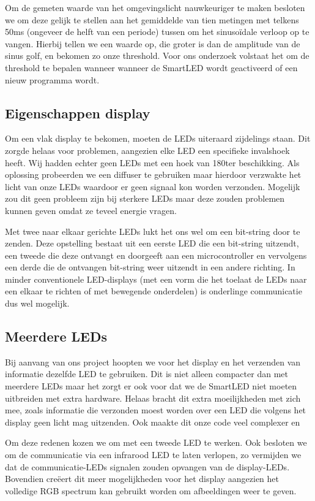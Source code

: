 \documentclass{article}
\begin{document}
Om de gemeten waarde van het omgevingslicht nauwkeuriger te maken besloten we om deze gelijk te stellen aan het gemiddelde van tien metingen met telkens 50ms (ongeveer de helft van een periode) tussen om het sinusoïdale verloop op te vangen. Hierbij tellen we een waarde op, die groter is dan de amplitude van de sinus golf, en bekomen zo onze threshold. 
Voor ons onderzoek volstaat het om de threshold te bepalen wanneer wanneer de SmartLED wordt geactiveerd of een nieuw programma wordt.

\subsection{Eigenschappen display}

Om een vlak display te bekomen, moeten de LEDs uiteraard zijdelings staan. Dit zorgde helaas voor problemen, aangezien elke LED een specifieke invalshoek heeft. Wij hadden echter geen LEDs met een hoek van 180\degree ter beschikking. Als oplossing probeerden we een diffuser te gebruiken maar hierdoor verzwakte het licht van onze LEDs waardoor er geen signaal kon worden verzonden. Mogelijk zou dit geen probleem zijn bij sterkere LEDs maar deze zouden problemen kunnen geven omdat ze teveel energie vragen. 

Met twee naar elkaar gerichte LEDs lukt het ons wel om een bit-string door te zenden. Deze opstelling bestaat uit een eerste LED die een bit-string uitzendt, een tweede die deze ontvangt en doorgeeft aan een microcontroller en vervolgens een derde die de ontvangen bit-string weer uitzendt in een andere richting. In minder conventionele LED-displays (met een vorm die het toelaat de LEDs naar een elkaar te richten of met bewegende onderdelen) is onderlinge communicatie dus wel mogelijk.

\subsection{Meerdere LEDs}
Bij aanvang van ons project hoopten we voor het display en het verzenden van informatie dezelfde LED te gebruiken. Dit is niet alleen compacter dan met meerdere LEDs maar het zorgt er ook voor dat we de SmartLED niet moeten uitbreiden met extra hardware. Helaas bracht dit extra moeilijkheden met zich mee, zoals informatie die verzonden moest worden over een LED die volgens het display geen licht mag uitzenden. Ook maakte dit onze code veel complexer en  

Om deze redenen kozen we om met een tweede LED te werken. Ook besloten we om de communicatie via een infrarood LED te laten verlopen, zo vermijden we dat de communicatie-LEDs signalen zouden opvangen van de display-LEDs. Bovendien creëert dit meer mogelijkheden voor het display aangezien het volledige RGB spectrum kan gebruikt worden om afbeeldingen weer te geven. 
\end{document}
